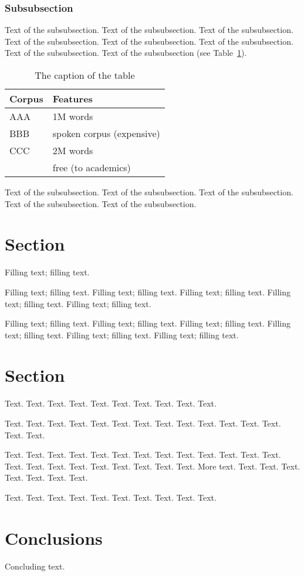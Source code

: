 \documentclass[11pt]{article}
\begin{document}
 
\subsubsection{Subsubsection}

Text of the subsubsection.
Text of the subsubsection.
Text of the subsubsection.
Text of the subsubsection.
Text of the subsubsection.
Text of the subsubsection.
Text of the subsubsection.
Text of the subsubsection (see Table~\ref{table1}).

\begin{table}[h]
 \begin{center}
\begin{tabular}{|l|l|}

      \hline
      Corpus & Features\\
      \hline\hline
      AAA & 1M words\\
      BBB & spoken corpus (expensive)\\
      CCC & 2M words\\
        & free (to academics)\\
      \hline

\end{tabular}
\caption{The caption of the table}\label{table1}
 \end{center}
\end{table}


Text of the subsubsection.
Text of the subsubsection.
Text of the subsubsection.
Text of the subsubsection.
Text of the subsubsection.


\section{Section}

Filling text; filling text.

Filling text; filling text.
Filling text; filling text.
Filling text; filling text.
Filling text; filling text.
Filling text; filling text.

Filling text; filling text.
Filling text; filling text.
Filling text; filling text.
Filling text; filling text.
Filling text; filling text.
Filling text; filling text.

\section{Section}

Text. Text. Text. Text. Text.
Text. Text. Text. Text. Text.

Text. Text. Text. Text. Text.
Text. Text. Text. Text. Text.
Text. Text. Text. Text. Text.

Text. Text. Text. Text. Text.
Text. Text. Text. Text. Text.
Text. Text. Text. Text. Text.
Text. Text. Text. Text. Text.
Text. Text. More text. Text. Text.
Text. Text. Text. Text. Text.

Text. Text. Text. Text. Text.
Text. Text. Text. Text. Text.

\section{Conclusions}

Concluding text.

%

\end{document}
